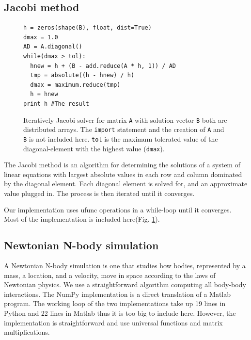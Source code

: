 \documentclass[10pt]{article}
\begin{document}
\subsection{Jacobi method}
\begin{figure}
\begin{lstlisting}
h = zeros(shape(B), float, dist=True)
dmax = 1.0
AD = A.diagonal()
while(dmax > tol):
  hnew = h + (B - add.reduce(A * h, 1)) / AD
  tmp = absolute((h - hnew) / h)
  dmax = maximum.reduce(tmp)
  h = hnew
print h #The result
\end{lstlisting}
 \caption{Iteratively Jacobi solver for matrix \texttt{A} with solution vector \texttt{B} both are distributed arrays. The \texttt{import} statement and the creation of \texttt{A} and \texttt{B} is not included here.
 \texttt{tol} is the maximum tolerated value of the diagonal-element with the highest value (\texttt{dmax}).}
 \label{lst:jocobi}
\end{figure}

The Jacobi method is an algorithm for determining the solutions of a system of linear equations with largest absolute values in each row and column dominated by the diagonal element. Each diagonal element is solved for, and an approximate value plugged in. The process is then iterated until it converges.

Our implementation uses ufunc operations in a while-loop until it converges. Most of the implementation is included here(Fig. \ref{lst:jocobi}).



\subsection{Newtonian N-body simulation}
A Newtonian N-body simulation is one that studies how bodies, represented by a mass, a location, and a velocity, move in space according to the laws of Newtonian physics. We use a straightforward algorithm computing all body-body interactions. The NumPy implementation is a direct translation of a Matlab program\cite{assignmentNbody}. The working loop of the two implementations take up 19 lines in Python and 22 lines in Matlab thus it is too big to include here. However, the implementation is straightforward and use universal functions and matrix multiplications.
\end{document}
